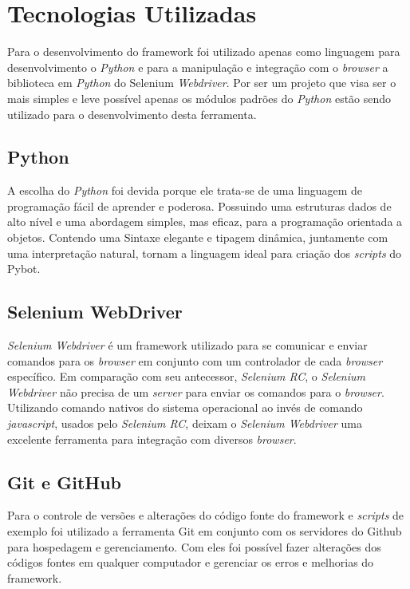 %
%

\chapter{Tecnologias Utilizadas}\label{chap:tec}
        Para o desenvolvimento do framework foi utilizado apenas como linguagem para desenvolvimento o \emph{Python}
        e para a manipulação e integração com o \emph{browser} a biblioteca em \emph{Python} do Selenium \emph{Webdriver}. Por ser um
        projeto que visa ser o mais simples e leve possível apenas os módulos padrões do \emph{Python} estão sendo utilizado
        para o desenvolvimento desta ferramenta.


        \section{Python}

            A escolha do \emph{Python} \cite{Python} foi devida porque ele trata-se de uma linguagem de programação fácil de aprender e poderosa.
            Possuindo uma estruturas dados de alto nível e uma abordagem simples, mas eficaz, para a programação orientada
            a objetos. Contendo uma Sintaxe elegante e tipagem dinâmica, juntamente com uma interpretação natural, tornam
            a linguagem ideal para criação dos \emph{scripts} do Pybot.

        \section{Selenium WebDriver}
        \label{webdriver}
            \emph{Selenium Webdriver} \cite{webdriver} é um framework utilizado para se comunicar e enviar comandos para os \emph{browser}
            em conjunto com um controlador de cada \emph{browser} específico. Em comparação com seu antecessor, \emph{Selenium RC}, o \emph{Selenium Webdriver}
            não precisa de um \emph{server} para enviar os comandos para o \emph{browser}. Utilizando comando nativos do sistema operacional ao invés de
            comando \emph{javascript}, usados pelo \emph{Selenium RC}, deixam o \emph{Selenium Webdriver} uma excelente ferramenta para integração com diversos
            \emph{browser}.

        \section{Git e GitHub}
            Para o controle de versões e alterações do código fonte do framework e \emph{scripts} de exemplo foi utilizado a ferramenta
            Git \cite{git} em conjunto com os servidores do Github \cite{github} para hospedagem e gerenciamento. Com eles foi possível
            fazer alterações dos códigos fontes em qualquer computador e gerenciar os erros e melhorias do framework.
